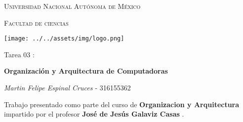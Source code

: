 \documentclass[14pt,letterpaper,fleqn]{article}
\begin{document}
\begin{titlepage}
    \centering

    {\scshape\LARGE Universidad Nacional Autónoma de México \par}

    \vspace{1cm}
    {\scshape\Large Facultad de ciencias\par}
    \vspace{1.5cm}

    \begin{center}
        \texttt{[image: ../../assets/img/logo.png]}
    \end{center}

    \vspace{.8 cm}

    {\LARGE Tarea  03 : \par}
    {\huge\bfseries Organización y Arquitectura de Computadoras \par}

    \vspace{0.5cm}
    \large{\itshape{Martin Felipe Espinal Cruces }} \small{ - 316155362 } \\ \vspace{0.3cm}
   
    \vfill

    Trabajo presentado como parte del curso de
    \textbf{Organizacion y Arquitectura}
    impartido por el profesor \textbf{	José de Jesús Galaviz Casas }. \par
    \vspace{0.1cm}
\end{titlepage}
\end{document}
